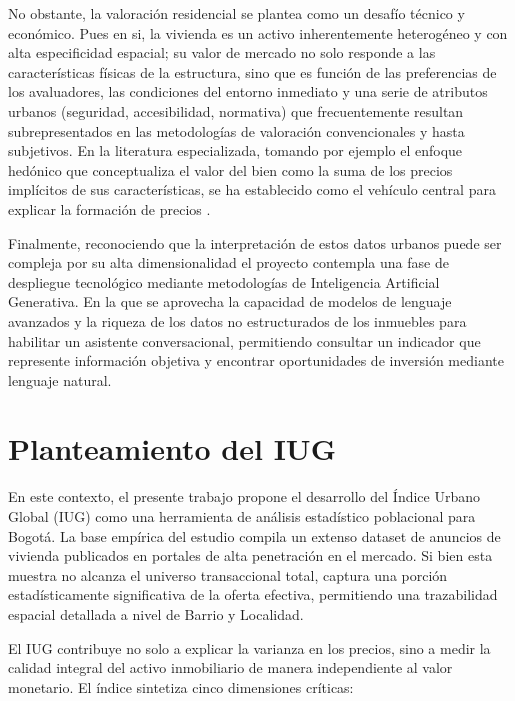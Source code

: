 \documentclass[12pt, a4paper, twoside, openright]{report}
\theoremstyle{plain}
\theoremstyle{definition}
\newcommand{\IUG}{IUG}             %
\begin{document}
No obstante, la valoración residencial se plantea como un desafío técnico y económico. Pues en si, la vivienda es un activo inherentemente heterogéneo y con alta especificidad espacial; su valor de mercado no solo responde a las características físicas de la estructura, sino que es función de las preferencias de los avaluadores, las condiciones del entorno inmediato y una serie de atributos urbanos (seguridad, accesibilidad, normativa) que frecuentemente resultan subrepresentados en las metodologías de valoración convencionales y hasta subjetivos. En la literatura especializada, tomando por ejemplo el enfoque hedónico que conceptualiza el valor del bien como la suma de los precios implícitos de sus características, se ha establecido como el vehículo central para explicar la formación de precios \citep{rosen1974}.


Finalmente, reconociendo que la interpretación de estos datos urbanos puede ser compleja por su alta dimensionalidad el proyecto contempla una fase de despliegue tecnológico mediante metodologías de Inteligencia Artificial Generativa. En la que se aprovecha la capacidad de modelos de lenguaje avanzados y la riqueza de los datos no estructurados de los inmuebles para habilitar un asistente conversacional, permitiendo consultar un indicador que represente información objetiva y encontrar oportunidades de inversión mediante lenguaje natural.


\section{Planteamiento del IUG}

En este contexto, el presente trabajo propone el desarrollo del Índice Urbano Global (\IUG{}) como una herramienta de análisis estadístico poblacional para Bogotá. La base empírica del estudio compila un extenso dataset de anuncios de vivienda publicados en portales de alta penetración en el mercado. Si bien esta muestra no alcanza el universo transaccional total, captura una porción estadísticamente significativa de la oferta efectiva, permitiendo una trazabilidad espacial detallada a nivel de Barrio y Localidad.



El \IUG{} contribuye no solo a explicar la varianza en los precios, sino a medir la calidad integral del activo inmobiliario de manera independiente al valor monetario. El índice sintetiza cinco dimensiones críticas:
\end{document}
